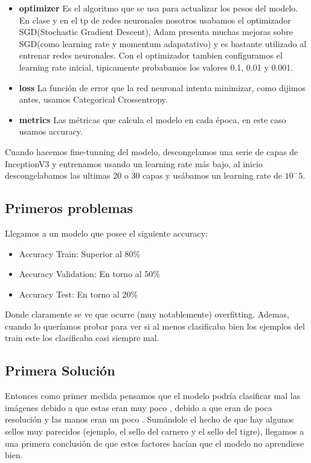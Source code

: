 \documentclass[12pt, titlepage, a4paper]{article}
\begin{document}
\begin{itemize}
    \item \textbf{optimizer} Es el algoritmo que se usa para actualizar los pesos del modelo. En clase y en el tp de redes neuronales nosotros usabamos el optimizador SGD(Stochastic Gradient Descent), Adam presenta muchas mejoras sobre SGD(como learning rate y momentum adapatativo) y es bastante utilizado al entrenar redes neuronales. Con el optimizador tambien configuramos el learning rate inicial, tipicamente probabamos los valores 0.1, 0.01 y 0.001.
    \item \textbf{loss} La función de error que la red neuronal intenta minimizar, como dijimos antes, usamos Categorical Crossentropy.
    \item \textbf{metrics} Las métricas que calcula el modelo en cada época, en este caso usamos accuracy.  
\end{itemize}

\noindent Cuando hacemos fine-tunning del modelo, descongelamos una serie de capas de InceptionV3 y entrenamos usando un learning rate más bajo, al inicio descongelabamos las ultimas 20 o 30 capas y usábamos un learning rate de $10^-5$.

\subsection{Primeros problemas}
\noindent Llegamos a un modelo que posee el siguiente accuracy:
\begin{itemize}
    \item Accuracy Train: Superior al 80\%
    \item Accuracy Validation: En torno al 50\%
    \item Accuracy Test: En torno al 20\%
\end{itemize}
Donde claramente se ve que ocurre (muy notablemente) overfitting. Ademas, cuando lo queríamos probar para ver si al menos clasificaba bien los ejemplos del train este los clasificaba casi siempre mal.\\

\subsection{Primera Solución}
Entonces como primer medida pensamos que el modelo podría clasificar mal las imágenes debido a que estas eran muy poco , debido a que eran de poca resolución y las manos eran un poco . Sumándole el hecho de que hay algunos sellos muy parecidos (ejemplo, el sello del carnero y el sello del tigre), llegamos a una primera conclusión de que estos factores hacían que el modelo no aprendiese bien.\\
\end{document}
